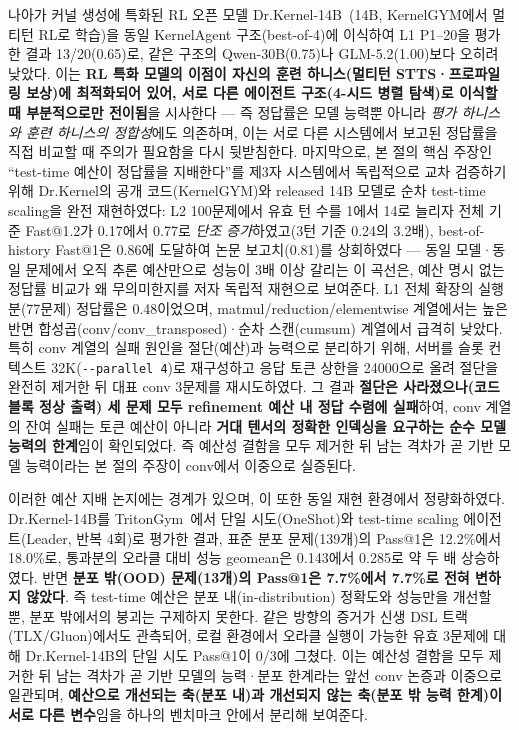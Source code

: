 \documentclass[sigplan,screen,review,anonymous]{acmart}
\begin{document}
나아가 커널 생성에 특화된 RL 오픈 모델 Dr.Kernel-14B~\cite{drkernel2026}(14B, KernelGYM에서 멀티턴 RL로 학습)을 동일 KernelAgent 구조(best-of-4)에 이식하여 L1 P1--20을 평가한 결과 13/20(0.65)로, 같은 구조의 Qwen-30B(0.75)나 GLM-5.2(1.00)보다 오히려 낮았다. 이는 \textbf{RL 특화 모델의 이점이 자신의 훈련 하니스(멀티턴 STTS·프로파일링 보상)에 최적화되어 있어, 서로 다른 에이전트 구조(4-시드 병렬 탐색)로 이식할 때 부분적으로만 전이됨}을 시사한다 --- 즉 정답률은 모델 능력뿐 아니라 \emph{평가 하니스와 훈련 하니스의 정합성}에도 의존하며, 이는 서로 다른 시스템에서 보고된 정답률을 직접 비교할 때 주의가 필요함을 다시 뒷받침한다. 마지막으로, 본 절의 핵심 주장인 ``test-time 예산이 정답률을 지배한다''를 제3자 시스템에서 독립적으로 교차 검증하기 위해 Dr.Kernel의 공개 코드(KernelGYM)와 released 14B 모델로 순차 test-time scaling을 완전 재현하였다: L2 100문제에서 유효 턴 수를 1에서 14로 늘리자 전체 기준 Fast@1.2가 0.17에서 0.77로 \emph{단조 증가}하였고(3턴 기준 0.24의 3.2배), best-of-history Fast@1은 0.86에 도달하여 논문 보고치(0.81)를 상회하였다 --- 동일 모델·동일 문제에서 오직 추론 예산만으로 성능이 3배 이상 갈리는 이 곡선은, 예산 명시 없는 정답률 비교가 왜 무의미한지를 저자 독립적 재현으로 보여준다. L1 전체 확장의 실행분(77문제) 정답률은 0.48이었으며, matmul/reduction/elementwise 계열에서는 높은 반면 합성곱(conv/conv\_transposed)·순차 스캔(cumsum) 계열에서 급격히 낮았다. 특히 conv 계열의 실패 원인을 절단(예산)과 능력으로 분리하기 위해, 서버를 슬롯 컨텍스트 32K(\texttt{-{}-parallel~4})로 재구성하고 응답 토큰 상한을 24000으로 올려 절단을 완전히 제거한 뒤 대표 conv 3문제를 재시도하였다. 그 결과 \textbf{절단은 사라졌으나(코드 블록 정상 출력) 세 문제 모두 refinement 예산 내 정답 수렴에 실패}하여, conv 계열의 잔여 실패는 토큰 예산이 아니라 \textbf{거대 텐서의 정확한 인덱싱을 요구하는 순수 모델 능력의 한계}임이 확인되었다. 즉 예산성 결함을 모두 제거한 뒤 남는 격차가 곧 기반 모델 능력이라는 본 절의 주장이 conv에서 이중으로 실증된다.

이러한 예산 지배 논지에는 경계가 있으며, 이 또한 동일 재현 환경에서 정량화하였다. Dr.Kernel-14B를 TritonGym~\cite{tritongym2026}에서 단일 시도(OneShot)와 test-time scaling 에이전트(Leader, 반복 4회)로 평가한 결과, 표준 분포 문제(139개)의 Pass@1은 12.2\%에서 18.0\%로, 통과분의 오라클 대비 성능 geomean은 0.143에서 0.285로 약 두 배 상승하였다. 반면 \textbf{분포 밖(OOD) 문제(13개)의 Pass@1은 7.7\%에서 7.7\%로 전혀 변하지 않았다}. 즉 test-time 예산은 분포 내(in-distribution) 정확도와 성능만을 개선할 뿐, 분포 밖에서의 붕괴는 구제하지 못한다. 같은 방향의 증거가 신생 DSL 트랙(TLX/Gluon)에서도 관측되어, 로컬 환경에서 오라클 실행이 가능한 유효 3문제에 대해 Dr.Kernel-14B의 단일 시도 Pass@1이 0/3에 그쳤다. 이는 예산성 결함을 모두 제거한 뒤 남는 격차가 곧 기반 모델의 능력·분포 한계라는 앞선 conv 논증과 이중으로 일관되며, \textbf{예산으로 개선되는 축(분포 내)과 개선되지 않는 축(분포 밖 능력 한계)이 서로 다른 변수}임을 하나의 벤치마크 안에서 분리해 보여준다.
\end{document}
